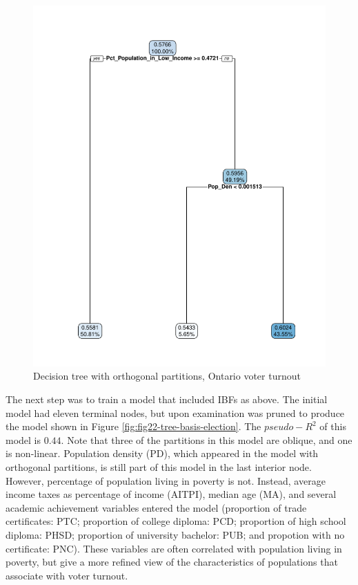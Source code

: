 \documentclass[]{elsarticle} %
\makeatletter
\def\maxwidth{\ifdim\Gin@nat@width>\linewidth\linewidth
\else\Gin@nat@width\fi}
\let\Oldincludegraphics\includegraphics
\renewcommand{\includegraphics}[1]{\Oldincludegraphics[width=\maxwidth]{#1}}
\makeatother
\begin{document}
\begin{figure}[htbp]
\centering
\includegraphics{Trees_with_Base_Functions_files/figure-latex/fig21-tree-orthogonal-election-1.pdf}
\caption{\label{fig:fig21-tree-orthogonal-election}Decision tree with
orthogonal partitions, Ontario voter turnout}
\end{figure}

The next step was to train a model that included IBFs as above. The
initial model had eleven terminal nodes, but upon examination was pruned
to produce the model shown in Figure
\ref{fig:fig22-tree-basis-election}. The \(pseudo-R^2\) of this model is
\(0.44\). Note that three of the partitions in this model are oblique,
and one is non-linear. Population density (PD), which appeared in the
model with orthogonal partitions, is still part of this model in the
last interior node. However, percentage of population living in poverty
is not. Instead, average income taxes as percentage of income (AITPI),
median age (MA), and several academic achievement variables entered the
model (proportion of trade certificates: PTC; proportion of college
diploma: PCD; proportion of high school diploma: PHSD; proportion of
university bachelor: PUB; and propotion with no certificate: PNC). These
variables are often correlated with population living in poverty, but
give a more refined view of the characteristics of populations that
associate with voter turnout.
\end{document}
